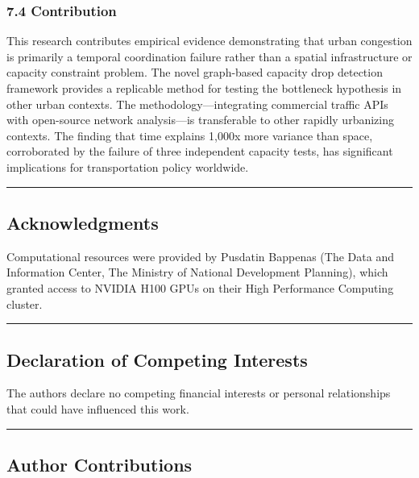 \subsubsection{7.4 Contribution}\label{contribution}

This research contributes empirical evidence demonstrating that urban congestion is primarily a temporal coordination failure rather than a spatial infrastructure or capacity constraint problem. The novel graph-based capacity drop detection framework provides a replicable method for testing the bottleneck hypothesis in other urban contexts. The methodology---integrating commercial traffic APIs with open-source network analysis---is transferable to other rapidly urbanizing contexts. The finding that time explains 1,000x more variance than space, corroborated by the failure of three independent capacity tests, has significant implications for transportation policy worldwide.

\begin{center}\rule{0.5\linewidth}{0.5pt}\end{center}

\subsection{Acknowledgments}\label{acknowledgments}

Computational resources were provided by Pusdatin Bappenas (The Data and Information Center, The Ministry of National Development Planning), which granted access to NVIDIA H100 GPUs on their High Performance Computing cluster.

\begin{center}\rule{0.5\linewidth}{0.5pt}\end{center}

\subsection{Declaration of Competing Interests}\label{declaration-of-competing-interests}

The authors declare no competing financial interests or personal relationships that could have influenced this work.

\begin{center}\rule{0.5\linewidth}{0.5pt}\end{center}

\subsection{Author Contributions}\label{author-contributions}

